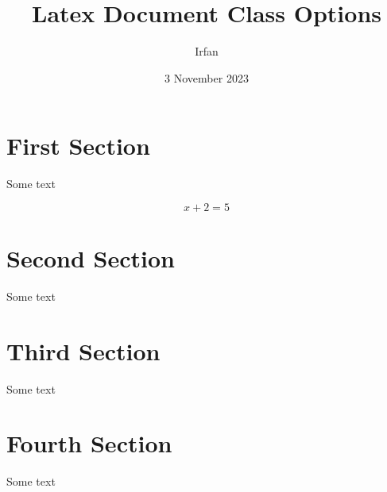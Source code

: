 \documentclass[12pt, fleqn, leqno, twocolumn, landscape]{article}
\title{Latex Document Class Options}
\author{Irfan}
\date{3 November 2023}
\begin{document}
  \maketitle

  \section{First Section}
    Some text

    \begin{equation}
      x + 2 = 5
    \end{equation}

  \section{Second Section}
    Some text

  \section{Third Section}
    Some text

  \section{Fourth Section}
    Some text
\end{document}
